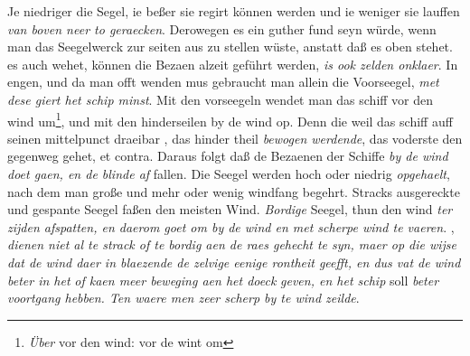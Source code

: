 \pstart Je niedriger die Segel\protect{}, ie beßer sie regirt k\"{o}nnen werden und ie weniger sie lauffen  \textit{van boven neer to geraecken}. Derowegen es ein guther fund seyn w\"{u}rde, wenn man das Seegelwerck\protect{} zur seiten aus zu stellen w\"{u}ste, anstatt daß es oben stehet.  es auch wehet, k\"{o}nnen die Bezaen\protect{} alzeit gef\"{u}hrt werden, \textit{is ook zelden onklaer}. In engen, und da man offt wenden mus gebraucht man allein die Voorseegel\protect{}, \textit{met dese giert het schip\protect{} minst}. Mit den vorseegeln\protect{} wendet man das schiff\protect{} vor den wind um\footnote{\textit{\"{U}ber} vor den wind: vor de wint om}, und mit den hinderseilen\protect{} by de wind op. Denn die weil das schiff\protect{} auff seinen mittelpunct draeibar , das hinder theil \textit{bewogen werdende}, das voderste den gegenweg gehet, et contra. Daraus folgt daß de Bezaenen\protect{} der Schiffe\protect{} \textit{by de wind doet gaen, en de blinde af} fallen. Die Seegel\protect{} werden hoch oder niedrig \textit{opgehaelt}, nach dem man große  und mehr oder wenig windfang begehrt. Stracks ausgereckte und gespante Seegel\protect{} faßen den meisten Wind. \textit{Bordige} Seegel\protect{}, thun den wind \textit{ter zijden afspatten, en daerom goet om by de wind en met scherpe wind te vaeren}. \protect{}, \textit{dienen niet al te strack of te bordig aen de raes gehecht te syn, maer op die wijse dat de wind daer in blaezende de zelvige eenige rontheit geefft, en dus vat de wind beter in het}  \textit{of kaen meer beweging aen het doeck}  \textit{geven, en het schip}\protect{} soll \textit{beter voortgang\protect{} hebben. Ten waere men zeer scherp by te wind zeilde}. 
